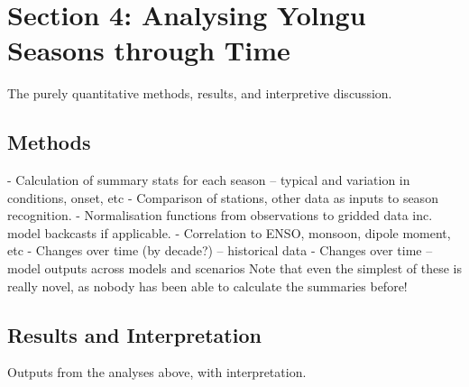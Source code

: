 \chapter{Section 4:  Analysing Yolngu Seasons through Time}
The purely quantitative methods, results, and interpretive discussion.

\section{Methods}
-	Calculation of summary stats for each season – typical and variation in conditions, onset, etc
-	Comparison of stations, other data as inputs to season recognition.
-	Normalisation functions from observations to gridded data inc. model backcasts if applicable.
-	Correlation to ENSO, monsoon, dipole moment, etc
-	Changes over time (by decade?) – historical data
-	Changes over time – model outputs across models and scenarios
Note that even the simplest of these is really novel, as nobody has been able to calculate the summaries before!

\section{Results and Interpretation}
Outputs from the analyses above, with interpretation.

